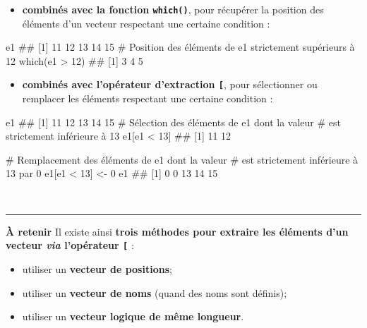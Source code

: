 \documentclass[12pt,twosided, notitlepage]{book}
\newenvironment{Shaded}{}{}
\newcommand{\KeywordTok}[1]{\textcolor[rgb]{0.00,0.00,1.00}{{#1}}}
\newcommand{\DecValTok}[1]{{#1}}
\newcommand{\StringTok}[1]{\textcolor[rgb]{0.00,0.50,0.50}{{#1}}}
\newcommand{\CommentTok}[1]{\textcolor[rgb]{0.00,0.50,0.00}{{#1}}}
\newcommand{\NormalTok}[1]{{#1}}
\providecommand{\tightlist}{%
  \setlength{\itemsep}{0pt}\setlength{\parskip}{0pt}}
\renewenvironment{Shaded}{\begin{snugshade}}{\end{snugshade}}
\begin{document}
\begin{itemize}
\tightlist
\item
  \textbf{combinés avec la fonction
  \texttt{which()}}, pour récupérer la
  position des éléments d'un vecteur respectant une certaine condition :
\end{itemize}

\begin{Shaded}
\begin{Highlighting}[]
\NormalTok{e1}
  \NormalTok{## [1] 11 12 13 14 15}
\CommentTok{# Position des éléments de e1 strictement supérieurs à 12}
\KeywordTok{which}\NormalTok{(e1 >}\StringTok{ }\DecValTok{12}\NormalTok{)}
  \NormalTok{## [1] 3 4 5}
\end{Highlighting}
\end{Shaded}

\begin{itemize}
\tightlist
\item
  \textbf{combinés avec l'opérateur d'extraction
  \texttt{{[}}}\index{\texttt{[}}, pour sélectionner ou remplacer les
  éléments respectant une certaine condition :
\end{itemize}

\begin{Shaded}
\begin{Highlighting}[]
\NormalTok{e1}
  \NormalTok{## [1] 11 12 13 14 15}
\CommentTok{# Sélection des éléments de e1 dont la valeur }
\CommentTok{# est strictement inférieure à 13}
\NormalTok{e1[e1 <}\StringTok{ }\DecValTok{13}\NormalTok{]}
  \NormalTok{## [1] 11 12}

\CommentTok{# Remplacement des éléments de e1 dont la valeur }
\CommentTok{# est strictement inférieure à 13 par 0}
\NormalTok{e1[e1 <}\StringTok{ }\DecValTok{13}\NormalTok{] <-}\StringTok{ }\DecValTok{0}
\NormalTok{e1}
  \NormalTok{## [1]  0  0 13 14 15}
\end{Highlighting}
\end{Shaded}

~

\begin{center}\rule{0.5\linewidth}{\linethickness}\end{center}

\textbf{À retenir} Il existe ainsi \textbf{trois méthodes pour extraire
les éléments d'un vecteur \emph{via} l'opérateur
\texttt{{[}}}\index{\texttt{[}} :

\begin{itemize}
\tightlist
\item
  utiliser un \textbf{vecteur de positions};
\item
  utiliser un \textbf{vecteur de noms} (quand des noms sont définis);
\item
  utiliser un \textbf{vecteur logique de même longueur}.
\end{itemize}
\end{document}
